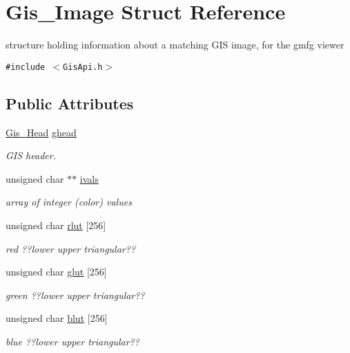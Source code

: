 \hypertarget{structGis__Image}{
\section{Gis\_\-Image Struct Reference}
\label{structGis__Image}
}
structure holding information about a matching GIS image, for the gmfg viewer  


{\tt \#include $<$Gis\-Api.h$>$}

\subsection*{Public Attributes}
\begin{CompactItemize}
\item 
\hyperlink{structGis__Head}{Gis\_\-Head} \hyperlink{structGis__Image_o0}{ghead}
\begin{CompactList}\small\item\em GIS header. \item\end{CompactList}\item 
unsigned char $\ast$$\ast$ \hyperlink{structGis__Image_o1}{ivals}
\begin{CompactList}\small\item\em array of integer (color) values \item\end{CompactList}\item 
unsigned char \hyperlink{structGis__Image_o2}{rlut} \mbox{[}256\mbox{]}
\begin{CompactList}\small\item\em red ??lower upper triangular?? \item\end{CompactList}\item 
unsigned char \hyperlink{structGis__Image_o3}{glut} \mbox{[}256\mbox{]}
\begin{CompactList}\small\item\em green ??lower upper triangular?? \item\end{CompactList}\item 
unsigned char \hyperlink{structGis__Image_o4}{blut} \mbox{[}256\mbox{]}
\begin{CompactList}\small\item\em blue ??lower upper triangular?? \item\end{CompactList}\end{CompactItemize}


